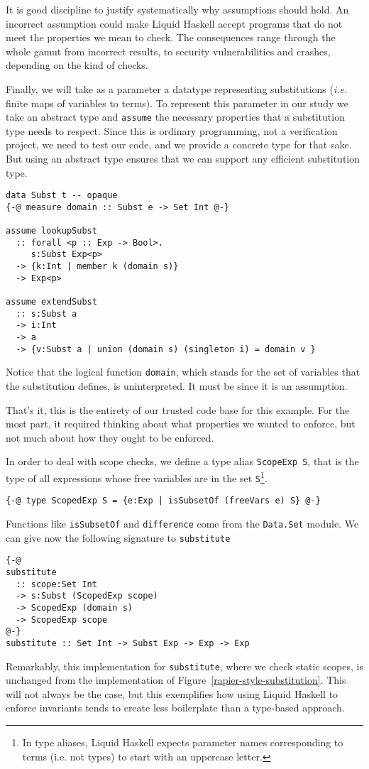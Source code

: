 \documentclass[sigconf]{acmart}
\newcommand{\tc}[1]{{\small\texttt{#1}}}
\begin{document}
It is good discipline to justify systematically why assumptions should hold.
An incorrect assumption could make Liquid Haskell accept programs that do not
meet the properties we mean to check. The consequences range through the whole
gamut from incorrect results, to security vulnerabilities and crashes, depending
on the kind of checks.

Finally, we will take as a parameter a datatype representing substitutions
(\emph{i.e.} finite maps of variables to terms). To represent this parameter in
our study we take an abstract type and \tc{assume} the necessary properties that a
substitution type needs to respect. Since this is ordinary programming, not a
verification project, we need to test our code, and we provide a concrete type
for that sake. But using an abstract type ensures that we can support
any efficient substitution type.

\begin{verbatim}
data Subst t -- opaque
{-@ measure domain :: Subst e -> Set Int @-}

assume lookupSubst
  :: forall <p :: Exp -> Bool>.
     s:Subst Exp<p>
  -> {k:Int | member k (domain s)}
  -> Exp<p>

assume extendSubst
  :: s:Subst a
  -> i:Int
  -> a
  -> {v:Subst a | union (domain s) (singleton i) = domain v }
\end{verbatim}

Notice that the logical function \tc{domain}, which stands for the set of
variables that the substitution defines, is uninterpreted. It must be since it is an
assumption.

That's it, this is the entirety of our trusted code base for this example. For
the most part, it required thinking about what properties we wanted to enforce,
but not much about how they ought to be enforced.

In order to deal with scope checks, we define a type alias \tc{ScopeExp S},
that is the type of all
expressions whose free variables are in the set \tc{S}\footnote{In type aliases,
Liquid Haskell expects parameter names corresponding to terms (i.e. not types) to start with
an uppercase letter.}.

\begin{verbatim}
{-@ type ScopedExp S = {e:Exp | isSubsetOf (freeVars e) S} @-}
\end{verbatim}
Functions like \tc{isSubsetOf} and \tc{difference} come from the \tc{Data.\allowbreak Set}
module. We can give now the following signature to \tc{substitute}
\begin{verbatim}
{-@
substitute
  :: scope:Set Int
  -> s:Subst (ScopedExp scope)
  -> ScopedExp (domain s)
  -> ScopedExp scope
@-}
substitute :: Set Int -> Subst Exp -> Exp -> Exp
\end{verbatim}
Remarkably, this implementation for \tc{substitute}, where we check static scopes,
is unchanged from the implementation of
Figure~\ref{rapier-style-substitution}. This will not always be the case, but this
exemplifies how using Liquid Haskell to enforce invariants tends to create less
boilerplate than a type-based approach.
\end{document}
